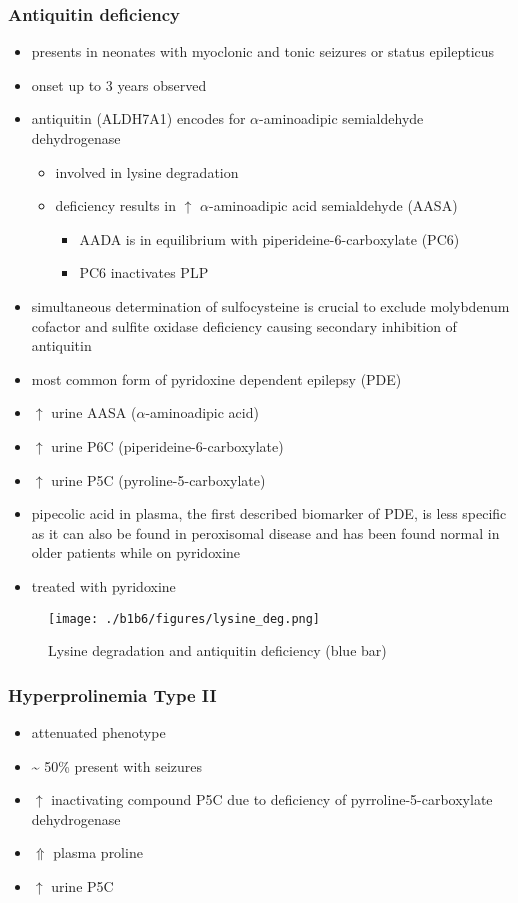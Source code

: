 \documentclass{scrartcl}
\begin{document}
\subsubsection{Antiquitin deficiency}
\label{sec:orgf57870b}
\begin{itemize}
\item presents in neonates with myoclonic and tonic seizures or
status epilepticus
\item onset up to 3 years observed
\item antiquitin (ALDH7A1) encodes for \(\alpha\)-aminoadipic semialdehyde dehydrogenase
\begin{itemize}
\item involved in lysine degradation
\item deficiency results in \(\uparrow\) \(\alpha\)-aminoadipic acid semialdehyde (AASA)
\begin{itemize}
\item AADA is in equilibrium with piperideine-6-carboxylate (PC6)
\item PC6 inactivates PLP
\end{itemize}
\end{itemize}
\item simultaneous determination of sulfocysteine is crucial to exclude
molybdenum cofactor and sulfite oxidase deficiency causing secondary
inhibition of antiquitin
\item most common form of pyridoxine dependent epilepsy (PDE)
\item \(\uparrow\) urine AASA (\(\alpha\)-aminoadipic acid)
\item \(\uparrow\) urine P6C (piperideine-6-carboxylate)
\item \(\uparrow\) urine P5C (pyroline-5-carboxylate)
\item pipecolic acid in plasma, the first described biomarker of PDE, is
less specific as it can also be found in peroxisomal disease and has
been found normal in older patients while on pyridoxine
\item treated with pyridoxine
\end{itemize}

\begin{figure}[htbp]
\centering
\texttt{[image: ./b1b6/figures/lysine\_deg.png]}
\caption{\label{fig:orgef80cfc}
Lysine degradation and antiquitin deficiency (blue bar)}
\end{figure}

\subsubsection{Hyperprolinemia Type II}
\label{sec:orge172033}
\begin{itemize}
\item attenuated phenotype
\item \textasciitilde{} 50\% present with seizures
\item \(\uparrow\) inactivating compound P5C due to deficiency of pyrroline-5-carboxylate dehydrogenase
\item \(\Uparrow\) plasma proline
\item \(\uparrow\) urine P5C
\end{itemize}
\end{document}
